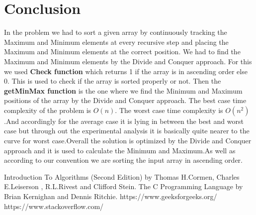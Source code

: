 \documentclass[conference]{IEEEtran}
\begin{document}
\section{\textbf{Conclusion}}
In the problem we had to sort a given array by continuously tracking the Maximum and Minimum elements at every recursive step and placing the Maximum and Minimum elements at the correct position. We had to find the Maximum and Minimum elements by the Divide and Conquer approach. For this we used \textbf{Check function} which returns 1 if the array is in ascending order else 0. This is used to check if the array is sorted properly or not. Then the \textbf{getMinMax function} is the one where we find the Minimum and Maximum positions of the array by the Divide and Conquer approach. The best case time complexity of the problem is $O(n)$. The worst case time complexity is $O(n^2)$.And accordingly for the average case it is lying in between the best and worst case but through out the experimental analysis it is basically quite nearer to the curve for worst case.Overall the solution is optimized by the Divide and Conquer approach and it is used to calculate the Minimum and Maximum.As well as according to our convention we are sorting the input array in ascending order. 

\begin{thebibliography}{1}
Introduction To Algorithms (Second Edition) by Thomas H.Cormen,
Charles E.Leiserson , R.L.Rivest and Clifford Stein.
\bibitem{}
The C Programming Language by Brian Kernighan and Dennis Ritchie.
\bibitem{}
https://www.geeksforgeeks.org/
\bibitem{}
https://www.stackoverflow.com/
\end{thebibliography}
\end{document}
